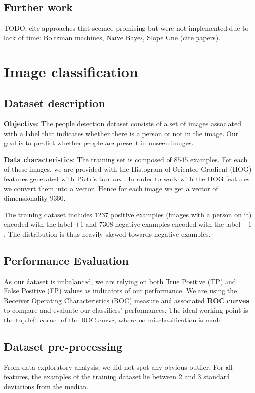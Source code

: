 \documentclass{article}
\begin{document}
  \subsection{Further work}
  TODO: cite approaches that seemed promising but were not implemented due to lack of time: Boltzman machines, Naïve Bayes, Slope One (cite papers).\\


\section{Image classification}

  \subsection{Dataset description}
  \textbf{Objective}: The people detection dataset consists of a set of images associated with a label that indicates whether there is a person or not in the image. Our goal is to predict whether people are present in unseen images.

  \textbf{Data characteristics}: The training set is composed of $8545$ examples. For each of these images, we are provided with the Histogram of Oriented Gradient (HOG) features generated with Piotr's toolbox \cite{piotrtoolbox}. In order to work with the HOG features we convert them into a vector. Hence for each image we get a vector of dimensionality $9360$.

  The training dataset includes $1237$ positive examples (images with a person on it) encoded with the label $+1$ and $7308$ negative examples encoded with the label $-1$. The distribution is thus heavily skewed towards negative examples.

  \subsection{Performance Evaluation}
  As our dataset is imbalanced, we are relying on both True Positive (TP) and False Positive (FP) values as indicators of our performance. We are using the Receiver Operating Characteristics (ROC) measure and associated \textbf{ROC curves} to compare and evaluate our classifiers' performances. The ideal working point is the top-left corner of the ROC curve, where no misclassification is made.

  \subsection{Dataset pre-processing}
  From data exploratory analysis, we did not spot any obvious outlier. For all features, the examples of the training dataset lie between 2 and 3 standard deviations from the median.
\end{document}

